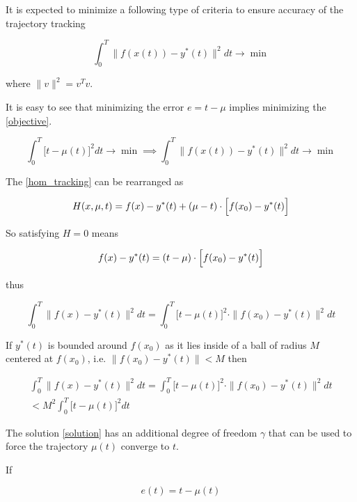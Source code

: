 \documentclass[11pt,american]{article}
\begin{document}
It is expected to minimize a following type of criteria to ensure accuracy of the trajectory tracking
  
\begin{equation}\label{objective}
\int_0^T \| f(x(t)) - y^*(t) \|^2 dt \to \min
\end{equation}

where $\| v \|^2 = v^T v$.

It is easy to see that minimizing the error $e = t - \mu$ implies minimizing the \eqref{objective}. 

\begin{equation}
\int_0^T \bigl[ t - \mu(t) \bigr]^2 dt \to \min  \implies  \int_0^T \| f(x(t)) - y^*(t) \|^2 dt \to \min
\end{equation}

The \eqref{hom_tracking} can be rearranged as

\begin{equation}
H(x,\mu, t) = f(x) - y^*(t) + (\mu - t) \cdot \Bigl[ f(x_0) - y^*(t) \Bigr] 
\end{equation}

So satisfying $H = 0$ means

\begin{equation}
f(x) - y^*(t) = (t - \mu) \cdot \Bigl[ f(x_0) - y^*(t) \Bigr] 
\end{equation}

thus

\begin{equation}
\int_0^T \| f(x) - y^*(t) \|^2 dt = \int_0^T \bigl[ t - \mu(t) \bigr]^2 \cdot \| f(x_0) - y^*(t) \|^2 dt
\end{equation}

If $y^*(t)$ is bounded around $f(x_0)$ as it lies inside of a ball of radius $M$ centered at $f(x_0)$, i.e. $\|f(x_0) - y^*(t)\| < M$ then

\begin{gather}
\int_0^T \| f(x) - y^*(t) \|^2 dt = \int_0^T \bigl[ t - \mu(t) \bigr]^2 \cdot \| f(x_0) - y^*(t) \|^2 dt \\
< M^2 \int_0^T \bigl[ t - \mu(t) \bigr]^2 dt
\end{gather}

The solution \eqref{solution} has an additional degree of freedom $\gamma$ that can be used to force the trajectory $\mu(t)$ converge to $t$. 

If 

\begin{equation}
e(t) = t - \mu(t)
\end{equation}
\end{document}
